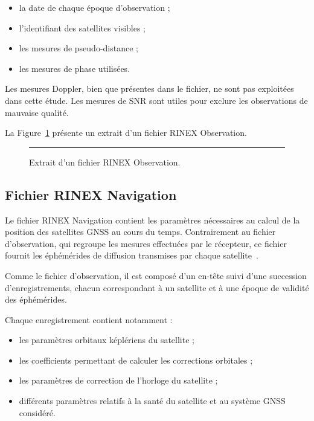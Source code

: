 \begin{itemize}
    \item la date de chaque époque d'observation ;
    \item l'identifiant des satellites visibles ;
    \item les mesures de pseudo-distance ;
    \item les mesures de phase utilisées.
\end{itemize}

Les mesures Doppler, bien que présentes dans le fichier, ne sont pas exploitées dans cette étude. Les mesures de SNR sont utiles pour exclure les observations de mauvaise qualité.

La Figure~\ref{fig:rinex_obs} présente un extrait d'un fichier RINEX Observation.

\begin{figure}[htbp]
    \centering
    \rule{0.8\linewidth}{5cm} %
    \caption{Extrait d'un fichier RINEX Observation.}
    \label{fig:rinex_obs}
\end{figure}

    \subsection{Fichier RINEX Navigation}

Le fichier RINEX Navigation contient les paramètres nécessaires au calcul de la position des satellites GNSS au cours du temps. Contrairement au fichier d'observation, qui regroupe les mesures effectuées par le récepteur, ce fichier fournit les éphémérides de diffusion transmises par chaque satellite~\cite{rinex304}.

Comme le fichier d'observation, il est composé d'un en-tête suivi d'une succession d'enregistrements, chacun correspondant à un satellite et à une époque de validité des éphémérides.

Chaque enregistrement contient notamment :

\begin{itemize}
    \item les paramètres orbitaux képlériens du satellite ;
    \item les coefficients permettant de calculer les corrections orbitales ;
    \item les paramètres de correction de l'horloge du satellite ;
    \item différents paramètres relatifs à la santé du satellite et au système GNSS considéré.
\end{itemize}


